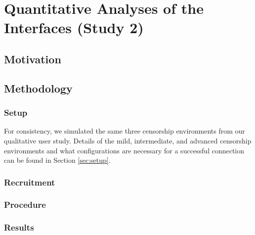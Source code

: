\documentclass{template}
\begin{document}
\section{Quantitative Analyses of the Interfaces (Study 2)}

\subsection{Motivation} 

\subsection{Methodology} 
\subsubsection{Setup}
For consistency, we simulated the same three censorship environments from 
our qualitative user study. Details of the mild, intermediate, and advanced 
censorship environments and what configurations are necessary for a 
successful connection can be found in Section \ref{sec:setup}. 

\subsubsection{Recruitment}
\subsubsection{Procedure}
\subsubsection{Results}
\end{document}
